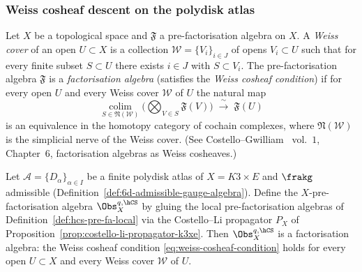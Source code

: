 \subsubsection{Weiss cosheaf descent on the polydisk atlas}
\label{subsubsec:weiss-cosheaf-descent-k3xe}

\begin{definition}
\label{def:weiss-cover-cosheaf}
Let $X$ be a topological space and $\mathfrak{F}$ a pre-factorisation
algebra on $X$. A \emph{Weiss cover} of an open $U \subset X$ is a
collection $\mathcal{W} = \{V_i\}_{i \in J}$ of opens
$V_i \subset U$ such that for every finite subset $S \subset U$ there
exists $i \in J$ with $S \subset V_i$. The pre-factorisation algebra
$\mathfrak{F}$ is a \emph{factorisation algebra} (satisfies the
\emph{Weiss cosheaf condition}) if for every open $U$ and every Weiss
cover $\mathcal{W}$ of $U$ the natural map
\begin{equation}
\label{eq:weiss-cosheaf-condition}
 \operatorname*{colim}_{S \in \mathfrak{N}(\mathcal{W})}
 \biggl( \bigotimes_{V \in S} \mathfrak{F}(V) \biggr) \;\xrightarrow{\;\sim\;}\; \mathfrak{F}(U)
\end{equation}
is an equivalence in the homotopy category of cochain complexes, where
$\mathfrak{N}(\mathcal{W})$ is the simplicial nerve of the Weiss cover.
\textup{(}See Costello--Gwilliam~\cite{CostelloGwilliam} vol.~$1$,
Chapter~$6$, factorisation algebras as Weiss cosheaves.\textup{)}
\end{definition}

\begin{theorem}
\label{thm:weiss-cosheaf-k3xe}
Let $\mathcal{A} = \{D_\alpha\}_{\alpha \in I}$ be a finite polydisk
atlas of $X = K3 \times E$ and $\frakg$ admissible
\textup{(Definition~\ref{def:6d-admissible-gauge-algebra})}. Define the
$X$-pre-factorisation algebra $\Obs^{q,\hCS}_X$ by gluing the local
pre-factorisation algebras of Definition~\ref{def:hcs-pre-fa-local} via
the Costello--Li propagator $P_X$ of
Proposition~\ref{prop:costello-li-propagator-k3xe}. Then $\Obs^{q,\hCS}_X$
is a factorisation algebra: the Weiss cosheaf condition
\eqref{eq:weiss-cosheaf-condition} holds for every open $U \subset X$
and every Weiss cover $\mathcal{W}$ of $U$.
\end{theorem}

